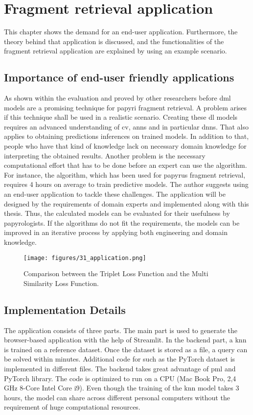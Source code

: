 \chapter{Fragment retrieval application}
\label{chap:application}

This chapter shows the demand for an end-user application. Furthermore, the theory behind that application is discussed, and the functionalities of the fragment retrieval application are explained by using an example scenario. 

\section{Importance of end-user friendly applications}
\label{sec:importance}
As shown within the evaluation and proved by other researchers before \ac{dml} models are a promising technique for papyri fragment retrieval. A problem arises if this technique shall be used in a realistic scenario. Creating these \ac{dl} models requires an advanced understanding of \ac{cv}, \acp{ann} and in particular \acp{dnn}. That also applies to obtaining predictions inferences on trained models. In addition to that, people who have that kind of knowledge lack on necessary domain knowledge for interpreting the obtained results.
Another problem is the necessary computational effort that has to be done before an expert can use the algorithm. For instance, the  algorithm, which has been used for papyrus fragment retrieval, requires 4 hours on average to train predictive models. The author suggests using an end-user application to tackle these challenges. The application will be designed by the requirements of domain experts and implemented along with this thesis. Thus, the calculated models can be evaluated for their usefulness by papyrologists. If the algorithms do not fit the requirements, the models can be improved in an iterative process by applying both engineering and domain knowledge. 

\begin{figure}[t]
	\centering
	\texttt{[image: figures/31\_application.png]}
	\caption{Comparison between the Triplet Loss Function and the Multi Similarity Loss Function.}
	\label{fig:application}
\end{figure} 


\section{Implementation Details}
\label{sec:implementation}
The application consists of three parts. The main part is used to generate the browser-based application with the help of Streamlit. In the backend part, a \ac{knn} is trained on a reference dataset. Once the dataset is stored as a file, a query can be solved within minutes. Additional code for such as the PyTorch dataset is implemented in different files. The backend takes great advantage of \ac{pml} and PyTorch library. The code is optimized to run on a CPU (Mac Book Pro, 2,4 GHz 8-Core Intel Core i9). Even though the training of the \ac{knn} model takes 3 hours, the model can share across different personal computers without the requirement of huge computational resources.

